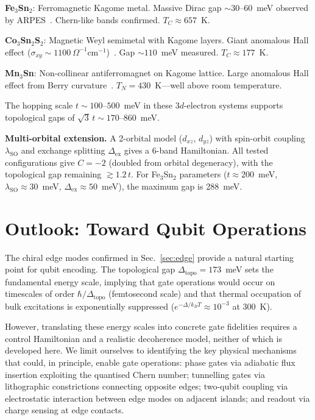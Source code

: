 \documentclass[aps,prb,twocolumn,superscriptaddress,floatfix]{revtex4-2}
\begin{document}
\textbf{Fe$_3$Sn$_2$}: Ferromagnetic Kagome metal. Massive Dirac gap $\sim 30$--$60$~meV observed by ARPES~\cite{ye2018}. Chern-like bands confirmed. $T_C \approx 657$~K.

\textbf{Co$_3$Sn$_2$S$_2$}: Magnetic Weyl semimetal with Kagome layers. Giant anomalous Hall effect ($\sigma_{xy} \sim 1100~\Omega^{-1}\mathrm{cm}^{-1}$)~\cite{liu2018}. Gap $\sim 110$~meV measured. $T_C \approx 177$~K.

\textbf{Mn$_3$Sn}: Non-collinear antiferromagnet on Kagome lattice. Large anomalous Hall effect from Berry curvature~\cite{nakatsuji2015}. $T_N = 430$~K---well above room temperature.

The hopping scale $t \sim 100$--$500$~meV in these $3d$-electron systems supports topological gaps of $\sqrt{3}\,t \sim 170$--$860$~meV.

\textbf{Multi-orbital extension.} A 2-orbital model ($d_{xz}$, $d_{yz}$) with spin-orbit coupling $\lambda_{\mathrm{SO}}$ and exchange splitting $\Delta_{\mathrm{ex}}$ gives a 6-band Hamiltonian. All tested configurations give $C = -2$ (doubled from orbital degeneracy), with the topological gap remaining $\gtrsim 1.2\,t$. For Fe$_3$Sn$_2$ parameters ($t \approx 200$~meV, $\lambda_{\mathrm{SO}} \approx 30$~meV, $\Delta_{\mathrm{ex}} \approx 50$~meV), the maximum gap is 288~meV.

\section{Outlook: Toward Qubit Operations}
\label{sec:robustness}

The chiral edge modes confirmed in Sec.~\ref{sec:edge} provide a natural starting point for qubit encoding. The topological gap $\Delta_{\mathrm{topo}} = 173$~meV sets the fundamental energy scale, implying that gate operations would occur on timescales of order $\hbar/\Delta_{\mathrm{topo}}$ (femtosecond scale) and that thermal occupation of bulk excitations is exponentially suppressed ($e^{-\Delta/k_BT} \approx 10^{-3}$ at 300~K).

However, translating these energy scales into concrete gate fidelities requires a control Hamiltonian and a realistic decoherence model, neither of which is developed here. We limit ourselves to identifying the key physical mechanisms that could, in principle, enable gate operations: phase gates via adiabatic flux insertion exploiting the quantised Chern number; tunnelling gates via lithographic constrictions connecting opposite edges; two-qubit coupling via electrostatic interaction between edge modes on adjacent islands; and readout via charge sensing at edge contacts.
\end{document}

